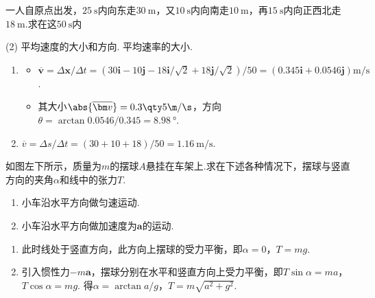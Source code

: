 \begin{problem} %
    一人自原点出发，$\qty{25}\s$内向东走$\qty{30}\m$，又$\qty{10}\s$内向南走$\qty{10}\m$，再$\qty{15}\s$内向正西北走$\qty{18}\m$.求在这$\qty{50}\s$内
    \begin{tasks}[label=\arabic*.](2)
        \task 平均速度的大小和方向.
        \task 平均速率的大小.
    \end{tasks}
\end{problem}
\begin{solution}\leavevmode
    \begin{enumerate}
        \item
        \begin{itemize}
            \item $\overline{\bm v}=\Delta\bm x/\Delta t=(30\bm i-10\bm j-18\bm i/\sqrt{2}+18\bm j/\sqrt{2})/50=(0.345\bm i+0.0546\bm j)\unit{\m/\s}$.
            \item 其大小$\abs{\overline{\bm v}}=0.3\qty5{\m/\s}$，方向$\theta=\arctan{0.0546/0.345}=\qty{8.98}\degree$.
        \end{itemize}
        \item $\overline v=\Delta s/\Delta t=(30+10+18)/50=\qty{1.16}{\m/\s}$.
    \end{enumerate}
\end{solution}

\begin{problem} %
    如图左下所示，质量为$m$的摆球$A$悬挂在车架上.求在下述各种情况下，摆球与竖直方向的夹角$\alpha$和线中的张力$T$.
    \begin{enumerate}
        \item 小车沿水平方向做匀速运动.
        \item 小车沿水平方向做加速度为$\bm a$的运动.
    \end{enumerate}
\end{problem}
\begin{solution}\leavevmode
    \begin{enumerate}
        \item 此时线处于竖直方向，此方向上摆球的受力平衡，即$\alpha=0$，$T=mg$.
        \item 引入惯性力$-m\bm a$，摆球分别在水平和竖直方向上受力平衡，即$T\sin\alpha=ma$，$T\cos\alpha=mg$. 得$\alpha=\arctan{a/g}$，$T=m\sqrt{a^2+g^2}$.
    \end{enumerate}
\end{solution}

